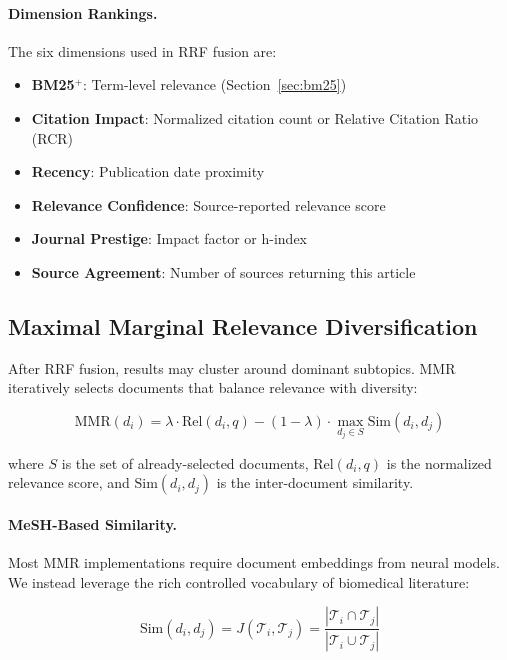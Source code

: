 \documentclass[11pt,a4paper]{article}
\begin{document}
\paragraph{Dimension Rankings.}
The six dimensions used in RRF fusion are:
\begin{itemize}
    \item \textbf{BM25$^{+}$}: Term-level relevance (Section~\ref{sec:bm25})
    \item \textbf{Citation Impact}: Normalized citation count or Relative Citation Ratio (RCR)
    \item \textbf{Recency}: Publication date proximity
    \item \textbf{Relevance Confidence}: Source-reported relevance score
    \item \textbf{Journal Prestige}: Impact factor or h-index
    \item \textbf{Source Agreement}: Number of sources returning this article
\end{itemize}

\subsection{Maximal Marginal Relevance Diversification}
\label{sec:mmr}

After RRF fusion, results may cluster around dominant subtopics.
MMR~\citep{carbonell1998mmr} iteratively selects documents that balance relevance with diversity:

\begin{equation}
\text{MMR}(d_i) = \lambda \cdot \text{Rel}(d_i, q) - (1 - \lambda) \cdot \max_{d_j \in S} \text{Sim}(d_i, d_j)
\label{eq:mmr}
\end{equation}

where $S$ is the set of already-selected documents, $\text{Rel}(d_i, q)$ is the normalized relevance score, and $\text{Sim}(d_i, d_j)$ is the inter-document similarity.

\paragraph{MeSH-Based Similarity.}
Most MMR implementations require document embeddings from neural models.
We instead leverage the rich controlled vocabulary of biomedical literature:

\begin{equation}
\text{Sim}(d_i, d_j) = J(\mathcal{T}_i, \mathcal{T}_j) = \frac{|\mathcal{T}_i \cap \mathcal{T}_j|}{|\mathcal{T}_i \cup \mathcal{T}_j|}
\label{eq:jaccard}
\end{equation}
\end{document}
